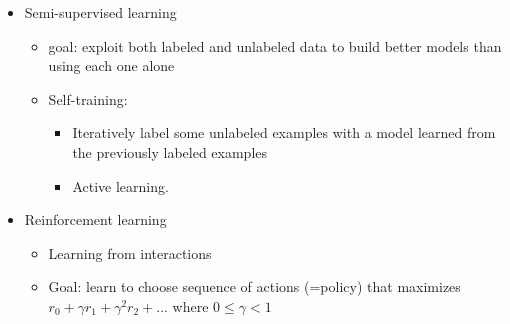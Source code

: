 \documentclass[
]{book}
\providecommand{\tightlist}{%
  \setlength{\itemsep}{0pt}\setlength{\parskip}{0pt}}
\begin{document}
\begin{itemize}
  \begin{itemize}
  \item
    Clustering

    \begin{itemize}
    \tightlist
    \item
      K-means clustering
    \item
      Spectral clustering
    \end{itemize}
  \item
    Density Estimation

    \begin{itemize}
    \tightlist
    \item
      Gaussian mixture model (GMM)
    \item
      Graphical models
    \end{itemize}
  \item
    Dimensionality reduction

    \begin{itemize}
    \tightlist
    \item
      Principal component analysis (PCA)
    \item
      Factor analysis
    \end{itemize}
  \end{itemize}
\item
  Semi-supervised learning

  \begin{itemize}
  \item
    goal: exploit both labeled and unlabeled data to build better models than using each one alone
  \item
    Self-training:

    \begin{itemize}
    \tightlist
    \item
      Iteratively label some unlabeled examples with a model learned from the previously labeled examples
    \item
      Active learning.
    \end{itemize}
  \end{itemize}
\item
  Reinforcement learning

  \begin{itemize}
  \tightlist
  \item
    Learning from interactions
  \item
    Goal: learn to choose sequence of actions (=policy) that maximizes \(r_0 + \gamma r_1 + \gamma^2r_2 + ...\) where \(0 \le \gamma <1\)
  \end{itemize}
\end{itemize}
\end{document}
